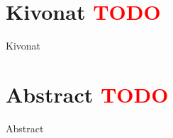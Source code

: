 \chapter*{Kivonat \textcolor{red}{TODO}}

Kivonat %
\vfill

\chapter*{Abstract \textcolor{red}{TODO}}

Abstract %
\vfill


